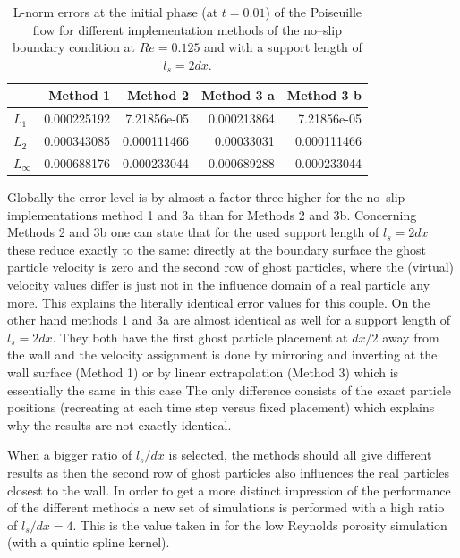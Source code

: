 \documentclass[11pt,a4paper,twoside]{report}
\begin{document}
 
\begin{table}[h] %
\label{tab:2DSPH_LinearWall_Poiseuille_Errors_t0_01}
\centering
\begin{tabular}[c]{||l||r|r|r|r||} %
\hline
\hline
 &{\bf Method 1} & {\bf Method 2} & {\bf Method 3 a}& {\bf Method 3 b}\\
\hline
\hline
$L_1$&0.000225192 & 7.21856e-05 & 0.000213864& 7.21856e-05\\
\hline
$L_2$&0.000343085 & 0.000111466 & 0.00033031& 0.000111466 \\
\hline
$L_\infty$&0.000688176 & 0.000233044 & 0.000689288& 0.000233044\\
\hline
\hline
\end{tabular}
  
  \caption[]{L-norm errors at the initial phase (at $t=0.01$) of the Poiseuille flow 
for different implementation methods of the no--slip boundary condition at $Re=0.125$ and with a support length of $l_s=2dx$.}
\end{table}


Globally the error level is by almost a factor three higher for the no--slip implementations method 1 and 3a than for Methods 2 and 3b.
Concerning Methods 2 and 3b one can state that for the used support length of $l_s=2dx$
these reduce exactly to the same: directly at the boundary surface the ghost particle velocity is zero and the second row of ghost particles, where the (virtual) velocity values differ is just not in the influence domain of a real particle any more. This explains the literally identical error values for this couple. On the other hand methods 1 and 3a are almost identical as well for a support length of $l_s=2dx$. They both have the first ghost particle placement at $dx/2$ away from the wall and the velocity assignment is done by mirroring and inverting at the wall surface (Method 1) or by linear extrapolation (Method 3) which is essentially the same in this case %
The only difference consists of the exact particle positions (recreating at each time step versus fixed placement) which explains why the results are not exactly identical.

When a bigger ratio of $l_s/dx$ is selected, the methods should all give different results as then the second row of ghost particles also influences the real particles closest to the wall. In order to get a more distinct impression of the performance of the different methods a new set of simulations is performed with a high ratio of $l_s/dx=4$. This is the value taken in \cite{Zhu1999} for the low Reynolds porosity simulation (with a quintic spline kernel). %
\end{document}
